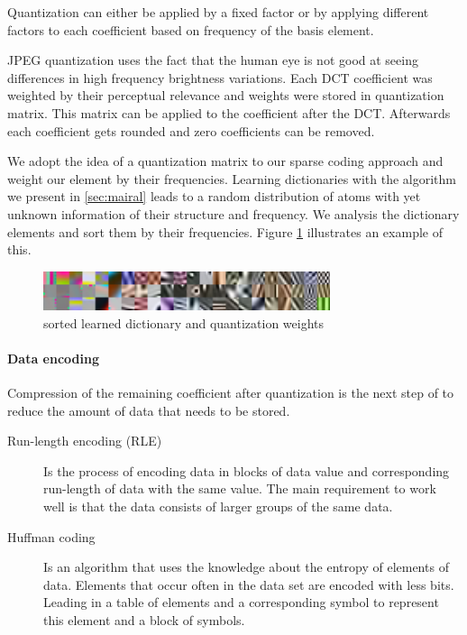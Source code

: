 Quantization can either be applied by a fixed factor or by applying different 
factors to each coefficient based on frequency of the basis element.

JPEG quantization uses the fact that the human eye is not good at seeing
differences in high frequency brightness variations. Each DCT coefficient was
weighted by their perceptual relevance and weights were stored in quantization
matrix. This matrix can be applied to the coefficient after the DCT. 
Afterwards each coefficient gets rounded and zero coefficients can be removed.

We adopt the idea of a quantization matrix to our sparse coding approach and
weight our element by their frequencies. Learning dictionaries with the
algorithm we present in \ref{sec:mairal} leads to a random distribution of atoms
with yet unknown information of their structure and frequency. We analysis the
dictionary elements and sort them by their frequencies. Figure 
\ref{fig:sorted} illustrates an example of this.


\begin{figure}[h]
\centering
\includegraphics[width = 0.75\textwidth]{images/sorted.png}
\caption{sorted learned dictionary and quantization weights}
\label{fig:sorted}
\end{figure}

\paragraph{Data encoding}
Compression of the remaining coefficient after quantization is the next step
of to reduce the amount of data that needs to be stored.
\begin{description}
 \item[Run-length encoding (RLE)] Is the process of encoding data in blocks of
data value and corresponding run-length of data with the same value. The main
requirement to work well is that the data consists of larger groups of the same
data.
  \item[Huffman coding] Is an algorithm that uses the knowledge about the
entropy of elements of data. Elements that occur often in the data set are
encoded with less bits. Leading in a table of elements and a corresponding
symbol to represent this element and a block of symbols.
\end{description}

